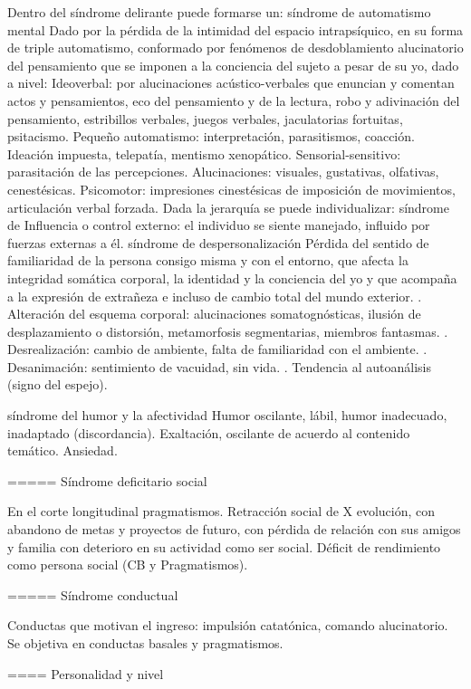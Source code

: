 Dentro del síndrome delirante puede formarse un: síndrome de automatismo mental Dado por la pérdida de la intimidad del espacio intrapsíquico, en su forma de triple automatismo, conformado por fenómenos de desdoblamiento alucinatorio del pensamiento que se imponen a la conciencia del sujeto a pesar de su yo, dado a nivel: Ideoverbal: por alucinaciones acústico-verbales que enuncian y comentan actos y pensamientos, eco del pensamiento y de la lectura, robo y adivinación del pensamiento, estribillos verbales, juegos verbales, jaculatorias fortuitas, psitacismo. Pequeño automatismo: interpretación, parasitismos, coacción. Ideación impuesta, telepatía, mentismo xenopático. Sensorial-sensitivo: parasitación de las percepciones. Alucinaciones: visuales, gustativas, olfativas, cenestésicas. Psicomotor: impresiones cinestésicas de imposición de movimientos, articulación verbal forzada. Dada la jerarquía se puede individualizar: síndrome de Influencia o control externo: el individuo se siente manejado, influido por fuerzas externas a él. síndrome de despersonalización Pérdida del sentido de familiaridad de la persona consigo misma y con el entorno, que afecta la integridad somática corporal, la identidad y la conciencia del yo y que acompaña a la expresión de extrañeza e incluso de cambio total del mundo exterior. . Alteración del esquema corporal: alucinaciones somatognósticas, ilusión de desplazamiento o distorsión, metamorfosis segmentarias, miembros fantasmas. . Desrealización: cambio de ambiente, falta de familiaridad con el ambiente. . Desanimación: sentimiento de vacuidad, sin vida. . Tendencia al autoanálisis (signo del espejo). 

síndrome del humor y la afectividad Humor oscilante, lábil, humor inadecuado, inadaptado (discordancia). Exaltación, oscilante de acuerdo al contenido temático. Ansiedad.

===== Síndrome deficitario social

En el corte longitudinal pragmatismos. Retracción social de X evolución, con abandono de metas y proyectos de futuro, con pérdida de relación con sus amigos y familia con deterioro en su actividad como ser social. Déficit de rendimiento como persona social (CB y Pragmatismos).

===== Síndrome conductual

Conductas que motivan el ingreso: impulsión catatónica, comando alucinatorio. Se objetiva en conductas basales y pragmatismos.

==== Personalidad y nivel

